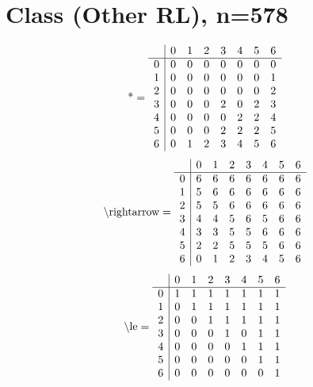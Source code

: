 \documentclass[11pt]{article}
\begin{document}
\section{Class (Other RL), n=578}
\[\text{*} = 
\begin{array}{r | r r r r r r r}
 & 0 & 1 & 2 & 3 & 4 & 5 & 6 \\ \hline
0 & 0 & 0 & 0 & 0 & 0 & 0 & 0 \\
1 & 0 & 0 & 0 & 0 & 0 & 0 & 1 \\
2 & 0 & 0 & 0 & 0 & 0 & 0 & 2 \\
3 & 0 & 0 & 0 & 2 & 0 & 2 & 3 \\
4 & 0 & 0 & 0 & 0 & 2 & 2 & 4 \\
5 & 0 & 0 & 0 & 2 & 2 & 2 & 5 \\
6 & 0 & 1 & 2 & 3 & 4 & 5 & 6 \\
\end{array}
\]
\[\text{\textbackslash rightarrow} = 
\begin{array}{r | r r r r r r r}
 & 0 & 1 & 2 & 3 & 4 & 5 & 6 \\ \hline
0 & 6 & 6 & 6 & 6 & 6 & 6 & 6 \\
1 & 5 & 6 & 6 & 6 & 6 & 6 & 6 \\
2 & 5 & 5 & 6 & 6 & 6 & 6 & 6 \\
3 & 4 & 4 & 5 & 6 & 5 & 6 & 6 \\
4 & 3 & 3 & 5 & 5 & 6 & 6 & 6 \\
5 & 2 & 2 & 5 & 5 & 5 & 6 & 6 \\
6 & 0 & 1 & 2 & 3 & 4 & 5 & 6 \\
\end{array}
\]
\[\text{\textbackslash le} = 
\begin{array}{r | r r r r r r r}
 & 0 & 1 & 2 & 3 & 4 & 5 & 6 \\ \hline
0 & 1 & 1 & 1 & 1 & 1 & 1 & 1 \\
1 & 0 & 1 & 1 & 1 & 1 & 1 & 1 \\
2 & 0 & 0 & 1 & 1 & 1 & 1 & 1 \\
3 & 0 & 0 & 0 & 1 & 0 & 1 & 1 \\
4 & 0 & 0 & 0 & 0 & 1 & 1 & 1 \\
5 & 0 & 0 & 0 & 0 & 0 & 1 & 1 \\
6 & 0 & 0 & 0 & 0 & 0 & 0 & 1 \\
\end{array}
\]
\end{document}
